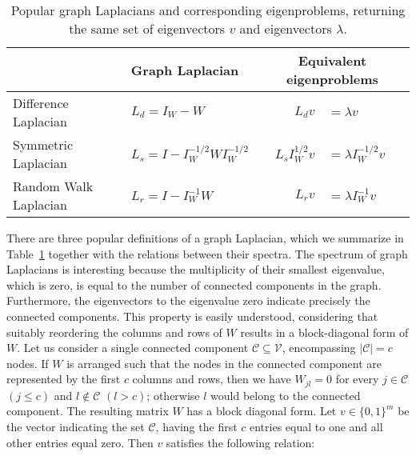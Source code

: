\begin{table}%
	\centering
    \caption{Popular graph Laplacians and corresponding eigenproblems, returning the same set of eigenvectors $v$ and eigenvectors $\lambda$.}
	\begin{tabular}{llrl}\toprule
 & Graph Laplacian & \multicolumn{2}{c}{Equivalent eigenproblems}  \\ \midrule
Difference Laplacian  & $L_d=I_W-W$ & $L_d v$ &$ =\lambda v$\\
Symmetric  Laplacian & $L_s=I-I_W^{-1/2}WI_W^{-1/2}$ & $L_s I_W^{1/2}v$ & $=\lambda I_W^{-1/2}v$\\
Random Walk Laplacian & $L_r= I-I_W^{-1}W$ & $L_rv$ & $=\lambda I_W^{-1}v$\\
 \bottomrule
\end{tabular}
\label{tbl:laplacians}
\end{table}
There are three popular definitions of a graph Laplacian, which we summarize in Table~\ref{tbl:laplacians} together with the relations between their spectra.   
The spectrum of graph Laplacians is interesting because the multiplicity of their smallest eigenvalue, which is zero, is equal to the number of connected components in the graph. Furthermore, the eigenvectors to the eigenvalue zero indicate precisely the connected components.
This property is easily understood, considering that suitably reordering the columns and rows of $W$ results in a block-diagonal form of $W$. Let us consider a single connected component $\mathcal{C}\subseteq\mathcal{V}$, encompassing $\lvert \mathcal{C}\rvert =c$ nodes. If $W$ is arranged such that the nodes in the connected component are represented by the first $c$ columns and rows, then we have $W_{jl}=0$ for every $j\in\mathcal{C}$ $(j\leq c)$ and $l\notin\mathcal{C}$ $(l>c)$; otherwise $l$ would belong to the connected component. The resulting matrix $W$ has a block diagonal form. Let $v\in\{0,1\}^m$ be the vector indicating the set $\mathcal{C}$, having the first $c$ entries equal to one and all other entries equal zero. Then $v$ satisfies the following relation:
